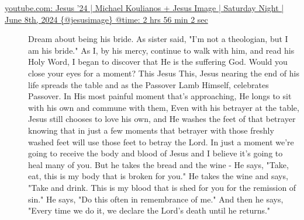 \documentclass[11pt]{article}
\author{root}
\date{\today}
\title{}
\begin{document}
\tableofcontents

\begin{description}
\item[{\href{https://youtube.com/watch?v=mLSCu4pKmu4\&t=10562}{youtube.com: Jesus '24 | Michael Koulianos + Jesus Image | Saturday Night | June 8th, 2024 \{@jesusimage\} @time: 2 hrs 56 min 2 sec}}] Dream about being his
bride. As sister said, "I'm not a
theologian, but I am his
bride." As I,
by his mercy, continue to walk with
him, and read his Holy
Word, I began to
discover that He is the suffering
God. Would you close your eyes for a
moment? This Jesus
This, Jesus nearing the end of his
life spreads the
table and as the Passover Lamb
Himself, celebrates Passover.
In His most painful moment that's
approaching, He longs to
sit with his own and commune with
them, Even with his betrayer at the
table, Jesus still
chooses to love his
own, and He washes the feet of that
betrayer knowing that in just a few
moments that betrayer with those freshly
washed feet will use those
feet to betray the
Lord. In just a moment we're going to
receive the body and blood of Jesus and
I believe it's going to heal many of you.
But he takes the bread and the wine - He
says, "Take, eat, this is my
body that is broken for you." He takes the
wine and says, "Take and drink. This is my
blood that is shed for you for the
remission of
sin." He says, "Do this
often in remembrance of me."
And then he says, "Every time we do
it, we declare the Lord's
death until he returns."


\end{description}
\end{document}
